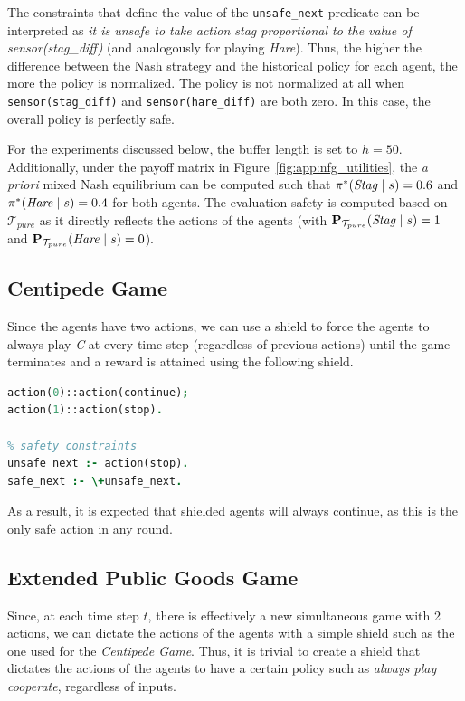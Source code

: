 The constraints that define the value of the \texttt{unsafe\_next} predicate can be interpreted as \textit{it is unsafe to take action stag proportional to the value of sensor(stag\_diff)} (and analogously for playing \textit{Hare}). Thus, the higher the difference between the Nash strategy and the historical policy for each agent, the more the policy is normalized. The policy is not normalized at all when \texttt{sensor(stag\_diff)} and \texttt{sensor(hare\_diff)} are both zero. In this case, the overall policy is perfectly safe.

For the experiments discussed below, the buffer length is set to $h=50$. Additionally, under the payoff matrix in Figure~\ref{fig:app:nfg_utilities}, the \textit{a priori} mixed Nash equilibrium can be computed such that $\pi^*(\text{\textit{Stag}}\mid s)=0.6$ and $\pi^*(\text{\textit{Hare}}\mid s)=0.4$ for both agents. The evaluation safety is computed based on $\mathcal{T}_{pure}$ as it directly reflects the actions of the agents (with $\mathbf{P}_{\mathcal{T}_{pure}}(\text{\textit{Stag}}\mid s)=1$ and $\mathbf{P}_{\mathcal{T}_{pure}}(\text{\textit{Hare}}\mid s)=0$).

\subsection{Centipede Game}

Since the agents have two actions, we can use a shield to force the agents to always play \textit{C} at every time step (regardless of previous actions) until the game terminates and a reward is attained using the following shield.
\begin{lstlisting}[language=Prolog, caption={Simple shield \shieldname{continue} for \textit{Centipede}}, label={shield:centipede}]
% actions
action(0)::action(continue);
action(1)::action(stop).

% safety constraints
unsafe_next :- action(stop).
safe_next :- \+unsafe_next.
\end{lstlisting}
As a result, it is expected that shielded agents will always continue, as this is the only safe action in any round.


\subsection{Extended Public Goods Game}

Since, at each time step $t$, there is effectively a new simultaneous game with 2 actions, we can dictate the actions of the agents with a simple shield such as the one used for the \textit{Centipede Game}. Thus, it is trivial to create a shield that dictates the actions of the agents to have a certain policy such as \textit{always play cooperate}, regardless of inputs.

